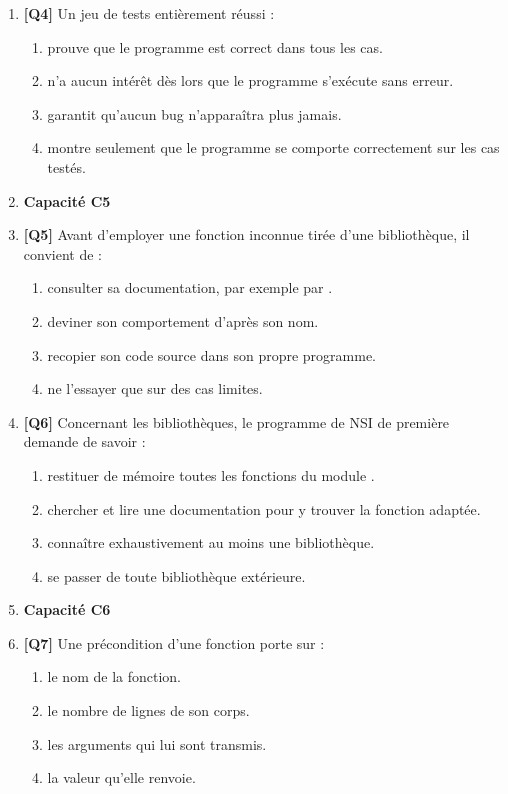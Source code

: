 \begin{enumerate}
\item \textbf{[Q4]} Un jeu de tests entièrement réussi :
  \begin{enumerate}[label=\Alph*.]
    \item prouve que le programme est correct dans tous les cas.
    \item n'a aucun intérêt dès lors que le programme s'exécute sans erreur.
    \item garantit qu'aucun bug n'apparaîtra plus jamais.
    \item montre seulement que le programme se comporte correctement sur les cas testés.
  \end{enumerate}

\item[] \textbf{Capacité C5}

\item \textbf{[Q5]} Avant d'employer une fonction inconnue tirée d'une bibliothèque, il convient de :
  \begin{enumerate}[label=\Alph*.]
    \item consulter sa documentation, par exemple par .
    \item deviner son comportement d'après son nom.
    \item recopier son code source dans son propre programme.
    \item ne l'essayer que sur des cas limites.
  \end{enumerate}

\item \textbf{[Q6]} Concernant les bibliothèques, le programme de NSI de première demande de savoir :
  \begin{enumerate}[label=\Alph*.]
    \item restituer de mémoire toutes les fonctions du module .
    \item chercher et lire une documentation pour y trouver la fonction adaptée.
    \item connaître exhaustivement au moins une bibliothèque.
    \item se passer de toute bibliothèque extérieure.
  \end{enumerate}

\item[] \textbf{Capacité C6}

\item \textbf{[Q7]} Une précondition d'une fonction porte sur :
  \begin{enumerate}[label=\Alph*.]
    \item le nom de la fonction.
    \item le nombre de lignes de son corps.
    \item les arguments qui lui sont transmis.
    \item la valeur qu'elle renvoie.
  \end{enumerate}


\end{enumerate}
